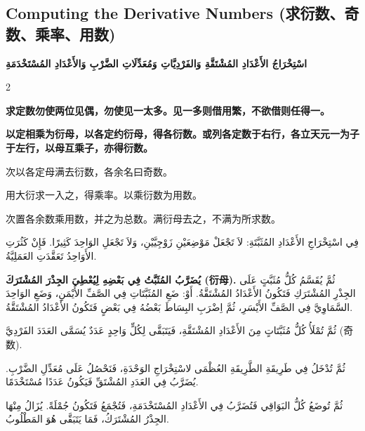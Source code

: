 \documentclass[11pt,a4paper]{article}
\newcommand{\ar}[1]{\arabicfont\beginR #1\endR}
\newcommand{\zhtext}[1]{{\chinese #1}}
\newenvironment{bilingual}{%
  \begin{paracol}{2}
}{%
  \end{paracol}
}
\begin{document}
\subsection{Computing the Derivative Numbers (\zhtext{求衍数、奇数、乘率、用数})}
\ar{\textbf{اسْتِخْرَاجُ الأَعْدَادِ المُشْتَقَّةِ وَالفَرْدِيَّاتِ وَمُعَدِّلَاتِ الضَّرْبِ وَالأَعْدَادِ المُسْتَخْدَمَةِ}}

\begin{bilingual}

\begin{leftcolumn*}
\textbf{\zhtext{求定数}勿使两位见偶，勿使见一太多。见一多则借用繁，不欲借则任得一。}

\textbf{\zhtext{以定相乘为衍母}，以各定约衍母，得各衍数。或列各定数于右行，各立天元一为子于左行，以母互乘子，亦得衍数。}

\zhtext{次以各定母满去衍数，各余名曰奇数。}

\zhtext{用大衍求一入之，得乘率。以乘衍数为用数。}

\zhtext{次置各余数乘用数，并之为总数。满衍母去之，不满为所求数。}
\end{leftcolumn*}

\begin{rightcolumn*}
\ar{فِي اسْتِخْرَاجِ الأَعْدَادِ المُثَبَّتَةِ: لاَ تَجْعَلْ مَوْضِعَيْنِ زَوْجِيَّيْنِ، وَلاَ تَجْعَلِ الوَاحِدَ كَثِيرًا. فَإِنْ كَثُرَتِ الأَوَاحِدُ تَعَقَّدَتِ العَمَلِيَّةُ.}

\ar{\textbf{يُضَرَّبُ المُثَبَّتُ فِي بَعْضِهِ لِيُعْطِيَ الجِذْرَ المُشْتَرَكَ (衍母).} ثُمَّ يُقَسَّمُ كُلُّ مُثَبَّتٍ عَلَى الجِذْرِ المُشْتَرَكِ فَتَكُونُ الأَعْدَادُ المُشْتَقَّةُ. أَوْ: ضَعِ المُثَبَّتَاتِ فِي الصَّفِّ الأَيْمَنِ، وَضَعِ الوَاحِدَ السَّمَاوِيَّ فِي الصَّفِّ الأَيْسَرِ، ثُمَّ اِضْرَبِ البِسَاطَ بَعْضُهُ فِي بَعْضٍ فَتَكُونُ الأَعْدَادُ المُشْتَقَّةُ.}

\ar{ثُمَّ تُمْلَأُ كُلُّ مُثَبَّتَاتٍ مِنَ الأَعْدَادِ المُشْتَقَّةِ، فَيَتَبَقَّى لِكُلٍّ وَاحِدٍ عَدَدٌ يُسَمَّى العَدَدَ الفَرْدِيَّ (奇数).}

\ar{ثُمَّ تُدْخَلُ فِي طَرِيقَةِ الطَّرِيقَةِ العُظْمَى لاسْتِخْرَاجِ الوَحْدَةِ، فَنَحْصُلُ عَلَى مُعَدِّلِ الضَّرْبِ. يُضَرَّبُ فِي العَدَدِ المُشْتَقِّ فَيَكُونُ عَدَدًا مُسْتَخْدَمًا.}

\ar{ثُمَّ تُوضَعُ كُلُّ البَوَاقِي فَتُضَرَّبُ فِي الأَعْدَادِ المُسْتَخْدَمَةِ، فَتُجْمَعُ فَتَكُونُ جُمْلَةً. يُزَالُ مِنْهَا الجِذْرُ المُشْتَرَكُ، فَمَا يَتَبَقَّى هُوَ المَطْلُوبُ.}
\end{rightcolumn*}

\end{bilingual}
\end{document}
